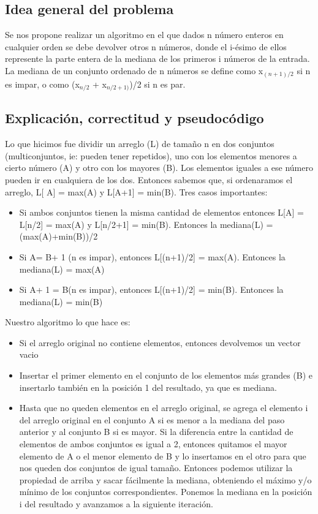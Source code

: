 \subsection{Idea general del problema}
Se nos propone realizar un algoritmo en el que dados n número enteros en cualquier orden se debe devolver otros n números, donde el i-ésimo de ellos represente la parte entera de la mediana de los primeros i números de la entrada.
La mediana de un conjunto ordenado de n números se define como x$_{(n+1)/2}$ si n es impar, o como (x$_{n/2}$ + x$_{n/2+1)}$)/2  si n es par.
\subsection{Explicación, correctitud y pseudocódigo}

Lo que hicimos fue dividir un arreglo (L) de tamaño n en dos conjuntos (multiconjuntos, ie: pueden tener repetidos), uno con los elementos menores a cierto número (A) y otro con los mayores (B). Los elementos iguales a ese número pueden ir en cualquiera de los dos. Entonces sabemos que, si ordenaramos el arreglo, L[ \textbar A\textbar] = max(A) y L[\textbar A\textbar+1] = min(B). Tres casos importantes: 

\begin{itemize}
\item Si ambos conjuntos tienen la misma cantidad de elementos entonces L[\textbar A\textbar] = L[n/2] = max(A) y L[n/2+1] = min(B). Entonces la mediana(L) = (max(A)+min(B))/2
\item Si \textbar A\textbar = \textbar B\textbar + 1 (n es impar), entonces L[(n+1)/2] = max(A). Entonces la mediana(L) = max(A)
\item Si \textbar A\textbar + 1 = \textbar B\textbar (n es impar), entonces L[(n+1)/2] = min(B). Entonces la mediana(L) = min(B)
\end{itemize}


Nuestro algoritmo lo que hace es: 
\begin{itemize}
\item Si el arreglo original no contiene elementos, entonces devolvemos un vector vacio
\item Insertar el primer elemento en el conjunto de los elementos más grandes (B) e insertarlo también en la posición 1 del resultado, ya que es mediana.
\item Hasta que no queden elementos en el arreglo original, se agrega el elemento i del arreglo original en el conjunto A si es menor a la mediana del paso anterior y al conjunto B si es mayor. Si la diferencia entre la cantidad de elementos de ambos conjuntos es igual a 2, entonces quitamos el mayor elemento de A o el menor elemento de B y lo insertamos en el otro para que nos queden dos conjuntos de igual tamaño. Entonces podemos utilizar la propiedad de arriba y sacar fácilmente la mediana, obteniendo el máximo y/o mínimo de los conjuntos correspondientes. Ponemos la mediana en la posición i del resultado y avanzamos a la siguiente iteración.
\end{itemize}

